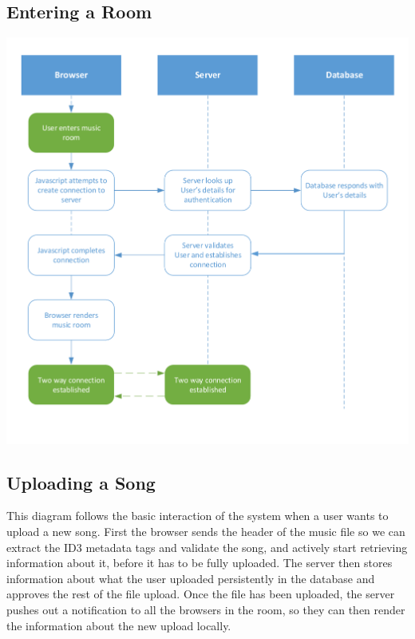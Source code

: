\documentclass[12pt]{report}
\begin{document}
\subsection{Entering a Room}

\includegraphics[scale=0.8]{entering_room.pdf}

\subsection{Uploading a Song}

This diagram follows the basic interaction of the system when a user wants to upload a new song. First the browser sends the header of the music file so we can extract the ID3 metadata tags and validate the song, and actively start retrieving information about it, before it has to be fully uploaded. The server then stores information about what the user uploaded persistently in the database and approves the rest of the file upload. Once the file has been uploaded, the server pushes out a notification to all the browsers in the room, so they can then render the information about the new upload locally.
\end{document}
